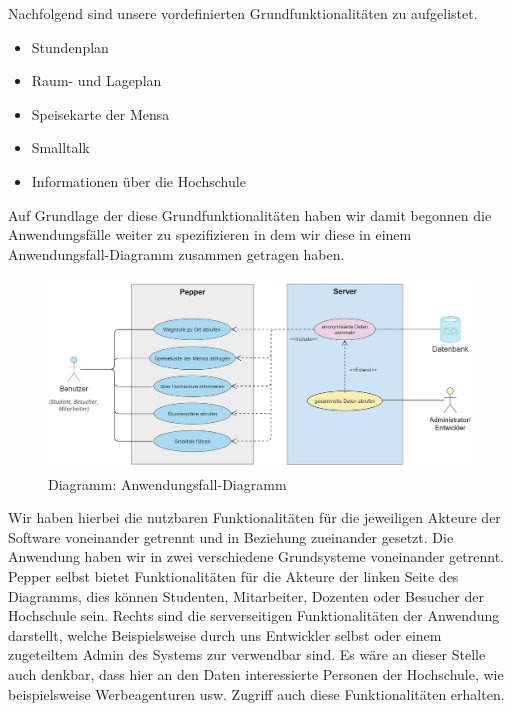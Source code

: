 

Nachfolgend sind unsere vordefinierten Grundfunktionalitäten zu aufgelistet.

\begin{itemize}
    \item Stundenplan
    \item Raum- und Lageplan
    \item Speisekarte der Mensa
    \item Smalltalk
    \item Informationen über die Hochschule
\end{itemize}

Auf Grundlage der diese Grundfunktionalitäten haben wir damit begonnen die Anwendungsfälle weiter zu spezifizieren in dem wir diese in einem Anwendungsfall-Diagramm zusammen getragen haben. 

\begin{figure}[H]
    \includegraphics[width=\textwidth]{Figures/use-case-diagram.jpg}
    \caption{Diagramm: Anwendungsfall-Diagramm}
    \label{fig:integration}
    \centering
\end{figure}

Wir haben hierbei die nutzbaren Funktionalitäten für die jeweiligen Akteure der Software voneinander getrennt und in Beziehung zueinander gesetzt. Die Anwendung haben wir in zwei verschiedene Grundsysteme voneinander getrennt. Pepper selbst bietet Funktionalitäten für die Akteure der linken Seite des Diagramms, dies können Studenten, Mitarbeiter, Dozenten oder Besucher der Hochschule sein. Rechts sind die serverseitigen Funktionalitäten der Anwendung darstellt, welche Beispielsweise durch uns Entwickler selbst oder einem zugeteiltem Admin des Systems zur verwendbar sind. Es wäre an dieser Stelle auch denkbar, dass hier an den Daten interessierte Personen der Hochschule, wie beispielsweise Werbeagenturen usw. Zugriff auch diese Funktionalitäten erhalten.

